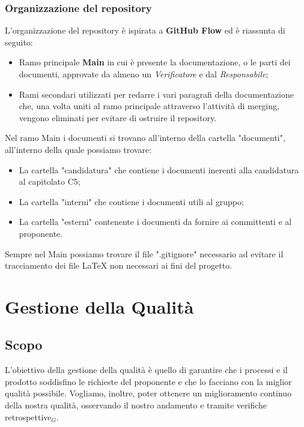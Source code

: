   \subsubsection{Organizzazione del repository}
  L'organizzazione del repository è ispirata a \textbf{GitHub Flow} ed è riassunta di seguito:
  \begin{itemize}
      \item Ramo principale \textbf{Main} in cui è presente la documentazione, o le parti dei documenti, approvate da almeno un \textit{Verificatore} e dal \textit{Responsabile};
      \item Rami secondari utilizzati per redarre i vari paragrafi della documentazione che, una volta uniti al ramo principale attraverso l'attività di merging, vengono eliminati per evitare di ostruire il repository.
  \end{itemize}
  Nel ramo Main i documenti si trovano all'interno della cartella "documenti", all'interno della quale possiamo trovare:
  \begin{itemize}
      \item La cartella "candidatura" che contiene i documenti inerenti alla candidatura al capitolato C5;
      \item La cartella "interni" che contiene i documenti utili al gruppo;
      \item La cartella "esterni" contenente i documenti da fornire ai committenti e al proponente.
  \end{itemize}
  Sempre nel Main possiamo trovare il file ".gitignore" necessario ad evitare il tracciamento dei file \LaTeX{} non necessari ai fini del progetto.


\section{Gestione della Qualità}
  \subsection{Scopo}
  L'obiettivo della gestione della qualità è quello di garantire
  che i processi e il prodotto soddisfino le richieste del proponente
  e che lo facciano con la miglior qualità possibile.
  \newline
  Vogliamo, inoltre, poter ottenere un miglioramento continuo della nostra
  qualità, osservando il nostro andamento e tramite verifiche retrospettive$_G$.

